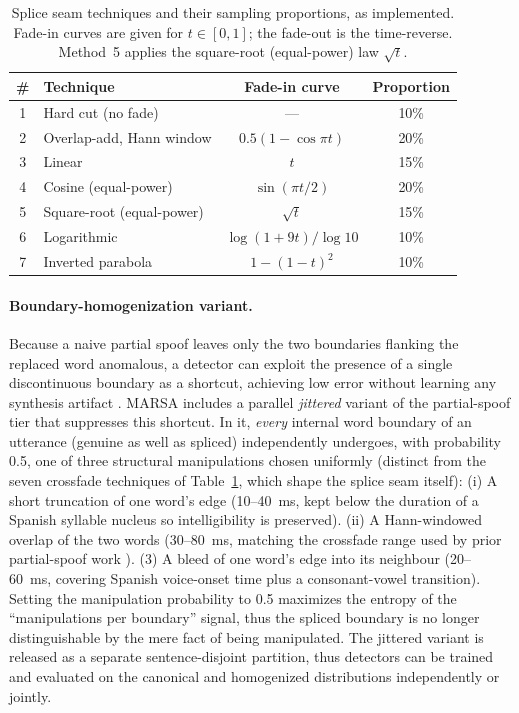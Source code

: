 \documentclass[11pt]{article}
\begin{document}
\begin{table}[t]
\centering
\caption{Splice seam techniques and their sampling
proportions, as implemented. Fade-in curves are given for
$t\in[0,1]$; the fade-out is the time-reverse. Method~5 applies the
square-root (equal-power) law $\sqrt{t}$.}
\label{tab:splice}
\small
\begin{tabular}{clcc}
\toprule
\textbf{\#} & \textbf{Technique} & \textbf{Fade-in curve} & \textbf{Proportion} \\
\midrule
1 & Hard cut (no fade)          & ---                       & 10\% \\
2 & Overlap-add, Hann window    & $0.5(1-\cos\pi t)$        & 20\% \\
3 & Linear                      & $t$                       & 15\% \\
4 & Cosine (equal-power)        & $\sin(\pi t/2)$           & 20\% \\
5 & Square-root (equal-power)   & $\sqrt{t}$                & 15\% \\
6 & Logarithmic                 & $\log(1+9t)/\log 10$      & 10\% \\
7 & Inverted parabola           & $1-(1-t)^2$               & 10\% \\
\bottomrule
\end{tabular}
\end{table}

\paragraph{Boundary-homogenization variant.} Because a naive partial
spoof leaves only the two boundaries flanking the replaced word
anomalous, a detector can exploit the presence of a single discontinuous
boundary as a shortcut, achieving low error without learning any
synthesis artifact \citep{negroni2024splicing}. MARSA includes a
parallel \emph{jittered} variant of the partial-spoof tier that
suppresses this shortcut. In it, \emph{every} internal word boundary of
an utterance (genuine as well as spliced) independently undergoes, with
probability 0.5, one of three structural manipulations chosen uniformly
(distinct from the seven crossfade techniques of Table~\ref{tab:splice},
which shape the splice seam itself):
(i) A short truncation of one word's edge (10--\SI{40}{\milli\second}, kept
below the duration of a Spanish syllable nucleus so intelligibility is
preserved). (ii) A Hann-windowed overlap of the two words
(30--\SI{80}{\milli\second}, matching the crossfade range used by prior
partial-spoof work \citep{luong2024llama}). (3) A bleed of one word's
edge into its neighbour (20--\SI{60}{\milli\second}, covering Spanish
voice-onset time plus a consonant-vowel transition). Setting the
manipulation probability to 0.5 maximizes the entropy of the
``manipulations per boundary'' signal, thus the spliced boundary is
no longer distinguishable by the mere fact of being manipulated. The jittered variant is released as a separate
sentence-disjoint partition, thus detectors can be trained and
evaluated on the canonical and homogenized distributions independently or
jointly.
\end{document}
